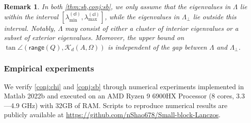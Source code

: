 \documentclass{article}
\newtheorem{remark}{Remark}%
\newcommand{\cl}{(\mathsf{cl})}
\newcommand{\range}{\mathsf{range}}
\begin{document}
\begin{remark}
    \label{rmk:sb}
    In both \cref{thm:sb,conj:sb}, we only assume that the eigenvalues in $\Lambda$ lie within the interval $[\lambda_{\min}^{\cl}, \lambda_{\max}^{\cl}]$, while the eigenvalues in $\Lambda_{\perp}$ lie outside this interval. Notably, $\Lambda$ may consist of either a cluster of interior eigenvalues or a subset of exterior eigenvalues. Moreover, the upper bound on $\tan\angle(\range(Q),\mathcal{K}_{d}(A,\Omega))$ is independent of the gap between $\Lambda$ and $\Lambda_{\perp}$.
\end{remark} 

\subsubsection{Empirical experiments}
\label{sec:numexp}
We verify \cref{conj:chi} and \cref{conj:sb} through numerical experiments implemented in Matlab 2022b and executed on an AMD Ryzen 9 6900HX Processor (8 cores, 3.3---4.9 GHz) with 32GB of RAM.
Scripts to reproduce
numerical results are publicly available at \url{https://github.com/nShao678/Small-block-Lanczos}.
\end{document}
